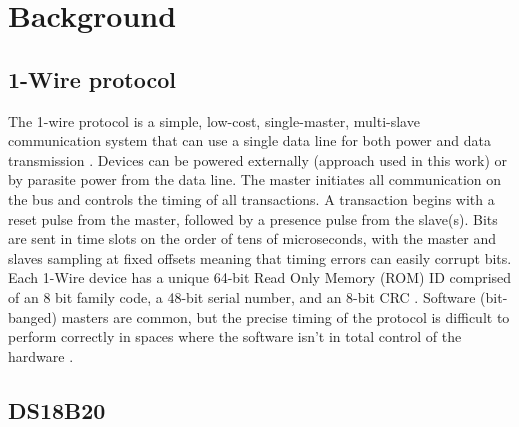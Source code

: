 \documentclass[conference]{IEEEtran}
\begin{document}
\section{Background}\label{sec:background}

\subsection{1-Wire protocol}

The 1-wire protocol is a simple, low-cost, single-master, multi-slave communication system that can use a single data line for both power and data transmission \cite{Analog_Devices_1w}.
Devices can be powered externally (approach used in this work) or by parasite power from the data line.
The master initiates all communication on the bus and controls the timing of all transactions.
A transaction begins with a reset pulse from the master, followed by a presence pulse from the slave(s).
Bits are sent in time slots on the order of tens of microseconds, with the master and slaves sampling at fixed offsets meaning that timing errors can easily corrupt bits.
Each 1-Wire device has a unique 64-bit Read Only Memory (ROM) ID comprised of an 8 bit family code, a 48-bit serial number, and an 8-bit CRC \cite{Analog_Devices_1w}.
Software (bit-banged) masters are common, but the precise timing of the protocol is difficult to perform correctly in spaces where the software isn't in total control of the hardware \cite{Analog_Devices_1w_software}.
\subsection{DS18B20}
\end{document}
